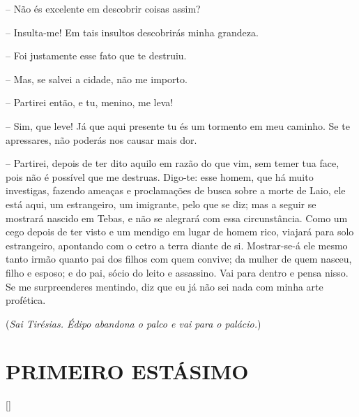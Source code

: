  --    Não és excelente em descobrir coisas assim?

 --   Insulta-me! Em tais insultos descobrirás minha grandeza.

 --   Foi justamente esse fato que te destruiu.

 --   Mas, se salvei a cidade, não me importo.

 --   Partirei então, e tu, menino, me leva!

 --   Sim, que leve! Já que aqui presente tu és um tormento em meu caminho. Se
te apressares, não poderás nos causar mais dor.

 --   Partirei, depois de ter dito aquilo em razão do que vim, sem temer tua
face, pois  não é possível que me destruas. Digo-te: esse homem,
que há muito investigas, fazendo ameaças e proclamações de busca sobre a
morte de Laio, ele está aqui, um estrangeiro, um imigrante, pelo que se
diz; mas a seguir se mostrará nascido em Tebas, e não se alegrará com
essa circunstância. Como um cego depois de ter visto e um mendigo em
lugar de homem rico, viajará para solo estrangeiro, apontando com o
cetro a terra diante de si. Mostrar-se-á ele mesmo tanto irmão quanto
pai dos filhos com quem  convive; da mulher de quem nasceu, filho e
esposo; e do pai, sócio do leito e assassino. Vai para dentro e pensa
nisso. Se me surpreenderes mentindo, diz que eu já não sei nada com
minha arte profética.

(\emph{Sai Tirésias. Édipo abandona o palco e vai para o palácio.})

\section{PRIMEIRO ESTÁSIMO}

\hfill [] 

